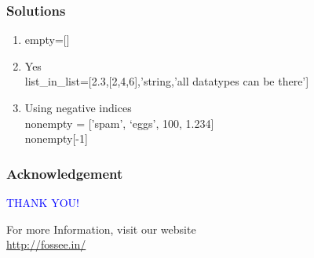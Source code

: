 \documentclass[presentation]{beamer}
\begin{document}
\begin{frame}
\frametitle{Solutions}
\label{sec-10}


\begin{enumerate}
\item empty=[]
\item Yes\\
list\_in\_list=[2.3,[2,4,6],'string,'all datatypes can be there']
\item Using negative indices\\
nonempty = ['spam', `eggs', 100, 1.234]\\
     nonempty[-1]
\end{enumerate}
\end{frame}
\begin{frame}
\frametitle{Acknowledgement}
\label{sec-11}

 \begin{block}{}
  \begin{center}
  \textcolor{blue}{\Large THANK YOU!} 
  \end{center}
  \end{block}
\begin{block}{}
  \begin{center}
    For more Information, visit our website\\
    \url{http://fossee.in/}
  \end{center}  
  \end{block}
\end{frame}
\end{document}
